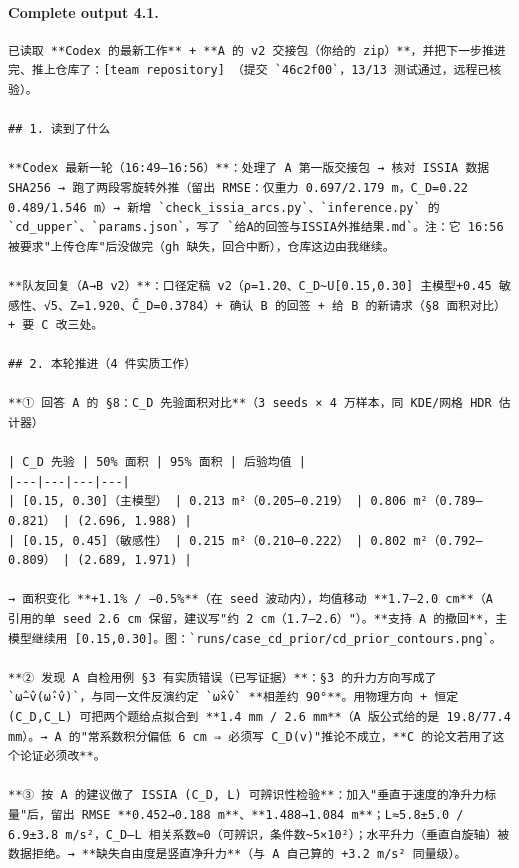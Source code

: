 \documentclass[UTF8,10pt]{ctexart}
\begin{document}
\paragraph{Complete output 4.1.}
\begin{Verbatim}[breaklines=true,breakanywhere=true,fontsize=\scriptsize,frame=single,framesep=2pt]
已读取 **Codex 的最新工作** + **A 的 v2 交接包（你给的 zip）**，并把下一步推进完、推上仓库了：[team repository] （提交 `46c2f00`，13/13 测试通过，远程已核验）。

## 1. 读到了什么

**Codex 最新一轮（16:49–16:56）**：处理了 A 第一版交接包 → 核对 ISSIA 数据 SHA256 → 跑了两段零旋转外推（留出 RMSE：仅重力 0.697/2.179 m，C_D=0.22 0.489/1.546 m）→ 新增 `check_issia_arcs.py`、`inference.py` 的 `cd_upper`、`params.json`，写了 `给A的回签与ISSIA外推结果.md`。注：它 16:56 被要求"上传仓库"后没做完（gh 缺失，回合中断），仓库这边由我继续。

**队友回复（A→B v2）**：口径定稿 v2（ρ=1.20、C_D~U[0.15,0.30] 主模型+0.45 敏感性、√5、Z=1.920、Ĉ_D=0.3784）+ 确认 B 的回签 + 给 B 的新请求（§8 面积对比）+ 要 C 改三处。

## 2. 本轮推进（4 件实质工作）

**① 回答 A 的 §8：C_D 先验面积对比**（3 seeds × 4 万样本，同 KDE/网格 HDR 估计器）

| C_D 先验 | 50% 面积 | 95% 面积 | 后验均值 |
|---|---|---|---|
| [0.15, 0.30]（主模型） | 0.213 m²（0.205–0.219） | 0.806 m²（0.789–0.821） | (2.696, 1.988) |
| [0.15, 0.45]（敏感性） | 0.215 m²（0.210–0.222） | 0.802 m²（0.792–0.809） | (2.689, 1.971) |

→ 面积变化 **+1.1% / −0.5%**（在 seed 波动内），均值移动 **1.7–2.0 cm**（A 引用的单 seed 2.6 cm 保留，建议写"约 2 cm（1.7–2.6）"）。**支持 A 的撤回**，主模型继续用 [0.15,0.30]。图：`runs/case_cd_prior/cd_prior_contours.png`。

**② 发现 A 自检用例 §3 有实质错误（已写证据）**：§3 的升力方向写成了 `ω̂−v̂(ω̂·v̂)`，与同一文件反演约定 `ω̂×v̂` **相差约 90°**。用物理方向 + 恒定 (C_D,C_L) 可把两个题给点拟合到 **1.4 mm / 2.6 mm**（A 版公式给的是 19.8/77.4 mm）。→ A 的"常系数积分偏低 6 cm ⇒ 必须写 C_D(v)"推论不成立，**C 的论文若用了这个论证必须改**。

**③ 按 A 的建议做了 ISSIA (C_D, L) 可辨识性检验**：加入"垂直于速度的净升力标量"后，留出 RMSE **0.452→0.188 m**、**1.488→1.084 m**；L≈5.8±5.0 / 6.9±3.8 m/s²，C_D–L 相关系数≈0（可辨识，条件数~5×10²）；水平升力（垂直自旋轴）被数据拒绝。→ **缺失自由度是竖直净升力**（与 A 自己算的 +3.2 m/s² 同量级）。


\end{Verbatim}
\end{document}
